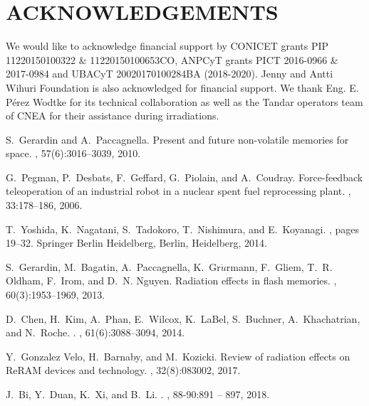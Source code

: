 \documentclass[square,aip,preprint,showkeys,superscriptaddress]{revtex4}
\begin{document}
\section{ACKNOWLEDGEMENTS}
We would like to acknowledge financial support by CONICET grants PIP 11220150100322 \& 11220150100653CO, ANPCyT grants PICT 2016-0966 \& 2017-0984 and UBACyT 20020170100284BA
(2018-2020). Jenny and Antti Wihuri Foundation is also acknowledged
for financial support. We thank Eng. E. P\'erez Wodtke for
its technical collaboration as well as the Tandar operators team of CNEA for their assistance during irradiations.

%
\begin{thebibliography}{10}
	
	S.~{Gerardin} and A.~{Paccagnella}.
	\newblock Present and future non-volatile memories for space.
	, 57(6):3016--3039, 2010.
	
	G.~Pegman, P.~Desbats, F.~Geffard, G.~Piolain, and A.~Coudray.
	\newblock Force-feedback teleoperation of an industrial robot in a nuclear
	spent fuel reprocessing plant.
	, 33:178--186, 2006.
	
	T.~Yoshida, K.~Nagatani, S.~Tadokoro, T.~Nishimura, and E.~Koyanagi.
	, pages
	19--32.
	\newblock Springer Berlin Heidelberg, Berlin, Heidelberg, 2014.
	
	S.~{Gerardin}, M.~{Bagatin}, A.~{Paccagnella}, K.~{Gr$\ddot{u}$rmann},
	F.~{Gliem}, T.~R. {Oldham}, F.~{Irom}, and D.~N. {Nguyen}.
	\newblock Radiation effects in flash memories.
	, 60(3):1953--1969, 2013.
	
	D.~{Chen}, H.~{Kim}, A.~{Phan}, E.~{Wilcox}, K.~{LaBel}, S.~{Buchner},
	A.~{Khachatrian}, and N.~{Roche}.
	.
	, 61(6):3088--3094, 2014.
	
	Y.~Gonzalez Velo, H.~Barnaby, and M.~Kozicki.
	\newblock Review of radiation effects on {ReRAM} devices and technology.
	, 32(8):083002, 2017.
	
	J.~Bi, Y.~Duan, K.~Xi, and B.~Li.
	.
	, 88-90:891 -- 897, 2018.
	

\end{thebibliography}
\end{document}
